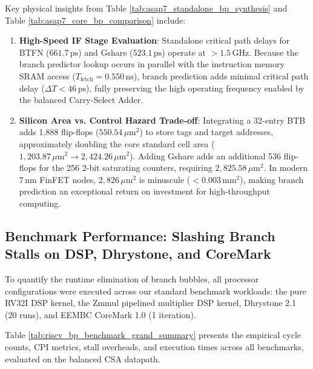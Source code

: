 Key physical insights from Table \ref{tab:asap7_standalone_bp_synthesis} and Table \ref{tab:asap7_core_bp_comparison} include:
\begin{enumerate}
    \item \textbf{High-Speed IF Stage Evaluation}: Standalone critical path delays for BTFN ($661.7\,\text{ps}$) and Gshare ($523.1\,\text{ps}$) operate at $>1.5\,\text{GHz}$. Because the branch predictor lookup occurs in parallel with the instruction memory SRAM access ($T_{\text{fetch}} = 0.550\,\text{ns}$), branch prediction adds minimal critical path delay ($\Delta T < 46\,\text{ps}$), fully preserving the high operating frequency enabled by the balanced Carry-Select Adder.
    \item \textbf{Silicon Area vs. Control Hazard Trade-off}: Integrating a 32-entry BTB adds 1,888 flip-flops ($550.54\,\mu\text{m}^2$) to store tags and target addresses, approximately doubling the core standard cell area ($1,203.87\,\mu\text{m}^2 \to 2,424.26\,\mu\text{m}^2$). Adding Gshare adds an additional 536 flip-flops for the 256 2-bit saturating counters, requiring $2,825.58\,\mu\text{m}^2$. In modern 7\,nm FinFET nodes, $2,826\,\mu\text{m}^2$ is minuscule ($<0.003\,\text{mm}^2$), making branch prediction an exceptional return on investment for high-throughput computing.
\end{enumerate}

\subsection{Benchmark Performance: Slashing Branch Stalls on DSP, Dhrystone, and CoreMark}

To quantify the runtime elimination of branch bubbles, all processor configurations were executed across our standard benchmark workloads: the pure RV32I DSP kernel, the Zmmul pipelined multiplier DSP kernel, Dhrystone 2.1 (20 runs), and EEMBC CoreMark 1.0 (1 iteration).

Table \ref{tab:riscv_bp_benchmark_grand_summary} presents the empirical cycle counts, CPI metrics, stall overheads, and execution times across all benchmarks, evaluated on the balanced CSA datapath.

